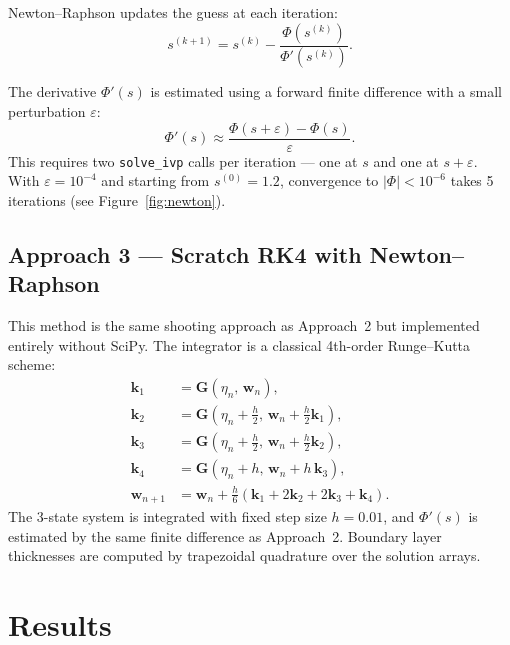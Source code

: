 \documentclass[12pt,a4paper]{article}
\begin{document}
Newton--Raphson updates the guess at each iteration:
\begin{equation}
    s^{(k+1)} = s^{(k)} - \frac{\Phi(s^{(k)})}{\Phi'(s^{(k)})}.
\end{equation}

The derivative $\Phi'(s)$ is estimated using a forward finite difference with a small perturbation $\varepsilon$:
\begin{equation}
    \Phi'(s) \approx \frac{\Phi(s + \varepsilon) - \Phi(s)}{\varepsilon}.
\end{equation}
This requires two \texttt{solve\_ivp} calls per iteration --- one at $s$ and one at $s + \varepsilon$. With $\varepsilon = 10^{-4}$ and starting from $s^{(0)} = 1.2$, convergence to $|\Phi| < 10^{-6}$ takes 5 iterations (see Figure~\ref{fig:newton}).

\subsection{Approach 3 --- Scratch RK4 with Newton--Raphson}

This method is the same shooting approach as Approach~2 but implemented entirely without SciPy. The integrator is a classical 4th-order Runge--Kutta scheme:
\begin{align}
    \mathbf{k}_1 &= \mathbf{G}(\eta_n,\, \mathbf{w}_n), \\
    \mathbf{k}_2 &= \mathbf{G}\!\left(\eta_n + \tfrac{h}{2},\, \mathbf{w}_n + \tfrac{h}{2}\mathbf{k}_1\right), \\
    \mathbf{k}_3 &= \mathbf{G}\!\left(\eta_n + \tfrac{h}{2},\, \mathbf{w}_n + \tfrac{h}{2}\mathbf{k}_2\right), \\
    \mathbf{k}_4 &= \mathbf{G}(\eta_n + h,\, \mathbf{w}_n + h\,\mathbf{k}_3), \\
    \mathbf{w}_{n+1} &= \mathbf{w}_n + \tfrac{h}{6}(\mathbf{k}_1 + 2\mathbf{k}_2 + 2\mathbf{k}_3 + \mathbf{k}_4).
\end{align}
The 3-state system is integrated with fixed step size $h = 0.01$, and $\Phi'(s)$ is estimated by the same finite difference as Approach~2. Boundary layer thicknesses are computed by trapezoidal quadrature over the solution arrays.

\section{Results}
\end{document}
